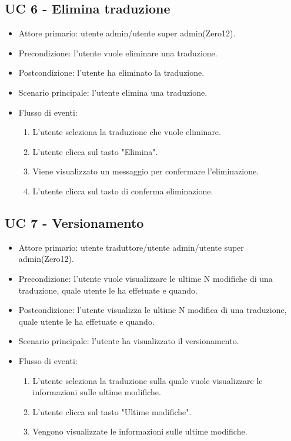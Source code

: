 \subsection{UC 6 - Elimina traduzione}
    \begin{itemize}
        \item Attore primario: utente admin/utente super admin(Zero12).
        \item Precondizione: l'utente vuole eliminare una traduzione.
        \item Postcondizione: l'utente ha eliminato la traduzione.
        \item Scenario principale: l'utente elimina una traduzione.
        \item Flusso di eventi:
            \begin{enumerate}
                \item L'utente seleziona la traduzione che vuole eliminare.
                \item L'utente clicca sul tasto "Elimina".
                \item Viene visualizzato un messaggio per confermare l'eliminazione.
                \item L'utente clicca sul tasto di conferma eliminazione.
            \end{enumerate}
    \end{itemize}
\subsection{UC 7 - Versionamento}
    \begin{itemize}
        \item Attore primario: utente traduttore/utente admin/utente super admin(Zero12).
        \item Precondizione: l'utente vuole visualizzare le ultime N modifiche di una traduzione, quale utente le ha effetuate e quando.
        \item Postcondizione: l'utente visualizza le ultime N modifica di una traduzione, quale utente le ha effetuate e quando.
        \item Scenario principale: l'utente ha visualizzato il versionamento.
        \item Flusso di eventi:
        \begin{enumerate}
            \item L'utente seleziona la traduzione sulla quale vuole visualizzare le informazioni sulle ultime modifiche.
            \item L'utente clicca sul tasto "Ultime modifiche".
            \item Vengono visualizzate le informazioni sulle ultime modifiche.
        \end{enumerate}
    \end{itemize}   
